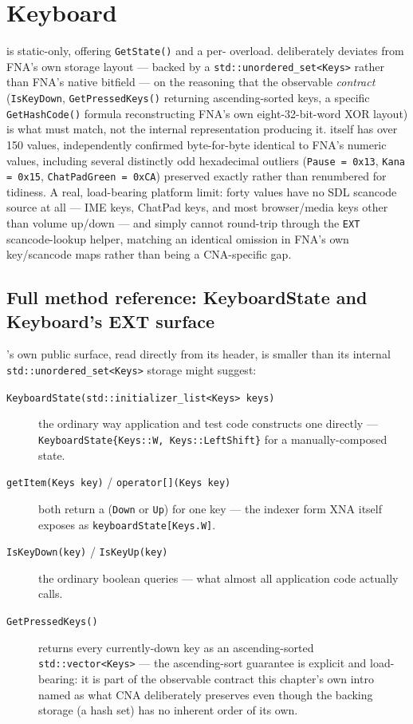 \section{Keyboard}

 is static-only, offering \texttt{GetState()} and a
per- overload.  deliberately deviates from
FNA's own storage layout --- backed by a \texttt{std::unordered\_set<Keys>} rather than
FNA's native bitfield --- on the reasoning that the observable \emph{contract}
(\texttt{IsKeyDown}, \texttt{GetPressedKeys()} returning ascending-sorted keys, a specific
\texttt{GetHashCode()} formula reconstructing FNA's own eight-32-bit-word XOR layout) is what
must match, not the internal representation producing it.  itself has over
150 values, independently confirmed byte-for-byte identical to FNA's numeric values,
including several distinctly odd hexadecimal outliers (\texttt{Pause = 0x13},
\texttt{Kana = 0x15}, \texttt{ChatPadGreen = 0xCA}) preserved exactly rather than renumbered
for tidiness. A real, load-bearing platform limit: forty  values have no SDL
scancode source at all --- IME keys, ChatPad keys, and most browser/media keys other than
volume up/down --- and simply cannot round-trip through the \texttt{EXT} scancode-lookup
helper, matching an identical omission in FNA's own key/scancode maps rather than being a
CNA-specific gap.

\subsection{Full method reference: KeyboardState and Keyboard's EXT surface}

's own public surface, read directly from its header, is smaller than
its internal \texttt{std::unordered\_set<Keys>} storage might suggest:

\begin{description}
\item[\texttt{KeyboardState(std::initializer\_list<Keys> keys)}] the ordinary way application
  and test code constructs one directly --- \texttt{KeyboardState\{Keys::W, Keys::LeftShift\}}
  for a manually-composed state.
\item[\texttt{getItem(Keys key)} / \texttt{operator[](Keys key)}] both return a
   (\texttt{Down} or \texttt{Up}) for one key --- the indexer form XNA
  itself exposes as \texttt{keyboardState[Keys.W]}.
\item[\texttt{IsKeyDown(key)} / \texttt{IsKeyUp(key)}] the ordinary boolean queries --- what
  almost all application code actually calls.
\item[\texttt{GetPressedKeys()}] returns every currently-down key as an ascending-sorted
  \texttt{std::vector<Keys>} --- the ascending-sort guarantee is explicit and load-bearing:
  it is part of the observable contract this chapter's own intro named as what CNA
  deliberately preserves even though the backing storage (a hash set) has no inherent order
  of its own.
\end{description}

